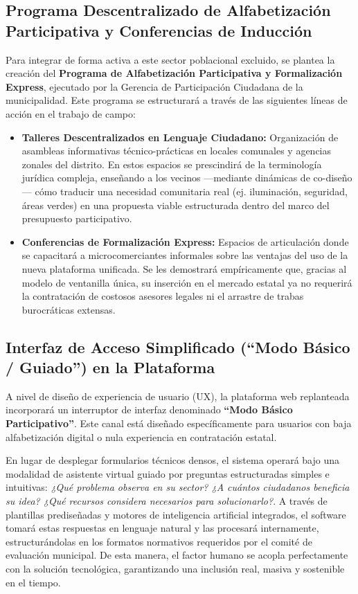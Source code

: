 \documentclass[12pt,a4paper]{article}
\begin{document}
\subsection{Programa Descentralizado de Alfabetización Participativa y Conferencias de Inducción}
Para integrar de forma activa a este sector poblacional excluido, se plantea la creación del \textbf{Programa de Alfabetización Participativa y Formalización Express}, ejecutado por la Gerencia de Participación Ciudadana de la municipalidad. Este programa se estructurará a través de las siguientes líneas de acción en el trabajo de campo:
\begin{itemize}
    \item \textbf{Talleres Descentralizados en Lenguaje Ciudadano:} Organización de asambleas informativas técnico-prácticas en locales comunales y agencias zonales del distrito. En estos espacios se prescindirá de la terminología jurídica compleja, enseñando a los vecinos ---mediante dinámicas de co-diseño--- cómo traducir una necesidad comunitaria real (ej. iluminación, seguridad, áreas verdes) en una propuesta viable estructurada dentro del marco del presupuesto participativo.
    \item \textbf{Conferencias de Formalización Express:} Espacios de articulación donde se capacitará a microcomerciantes informales sobre las ventajas del uso de la nueva plataforma unificada. Se les demostrará empíricamente que, gracias al modelo de ventanilla única, su inserción en el mercado estatal ya no requerirá la contratación de costosos asesores legales ni el arrastre de trabas burocráticas extensas.
\end{itemize}

\subsection{ Interfaz de Acceso Simplificado (``Modo Básico / Guiado'') en la Plataforma}
A nivel de diseño de experiencia de usuario (UX), la plataforma web replanteada incorporará un interruptor de interfaz denominado \textbf{``Modo Básico Participativo''}. Este canal está diseñado específicamente para usuarios con baja alfabetización digital o nula experiencia en contratación estatal.

En lugar de desplegar formularios técnicos densos, el sistema operará bajo una modalidad de asistente virtual guiado por preguntas estructuradas simples e intuitivas: \textit{¿Qué problema observa en su sector? ¿A cuántos ciudadanos beneficia su idea? ¿Qué recursos considera necesarios para solucionarlo?}. A través de plantillas prediseñadas y motores de inteligencia artificial integrados, el software tomará estas respuestas en lenguaje natural y las procesará internamente, estructurándolas en los formatos normativos requeridos por el comité de evaluación municipal. De esta manera, el factor humano se acopla perfectamente con la solución tecnológica, garantizando una inclusión real, masiva y sostenible en el tiempo.
\end{document}
